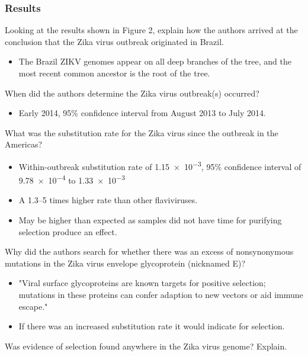 \documentclass[12pt,a4paper]{article}
\begin{document}
\subsubsection{Results}
\begin{itemize}
    {\color{G-Moon}\item Looking at the results shown in Figure 2, explain how the authors arrived at the conclusion that the Zika virus outbreak originated in Brazil.}
        \begin{itemize}
            \item The Brazil ZIKV genomes appear on all deep branches of the tree, and the most recent common ancestor is the root of the tree.
        \end{itemize}
    {\color{G-Moon}\item When did the authors determine the Zika virus outbreak(s) occurred?}
        \begin{itemize}
            \item Early 2014, 95\% confidence interval from August 2013 to July 2014.
        \end{itemize}
    {\color{G-Moon}\item What was the substitution rate for the Zika virus since the outbreak in the Americas?}
        \begin{itemize}
            \item Within-outbreak substitution rate of \num{1.15e-3},  95\% confidence interval of \num{9.78e-4} to \num{1.33e-3}
            \item A 1.3--5 times higher rate than other flaviviruses.
            \item May be higher than expected as samples did not have time for purifying selection produce an effect.
        \end{itemize}
    {\color{G-Moon}\item Why did the authors search for whether there was an excess of nonsynonymous mutations in the Zika virus envelope glycoprotein (nicknamed E)?}
        \begin{itemize}
            \item "Viral surface glycoproteins are known targets for positive selection; mutations in these proteins can confer adaption to new vectors or aid immune escape."
            \item If there was an increased substitution rate it would indicate for selection.
        \end{itemize}
    {\color{G-Moon}\item Was evidence of selection found anywhere in the Zika virus genome? Explain.}

\end{itemize}
\end{document}
